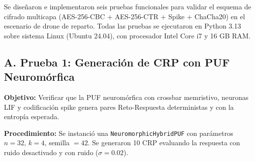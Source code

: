 Se diseñaron e implementaron seis pruebas funcionales para validar el esquema de cifrado multicapa (AES-256-CBC + AES-256-CTR + Spike + ChaCha20) en el escenario de drone de reparto. Todas las pruebas se ejecutaron en Python 3.13 sobre sistema Linux (Ubuntu 24.04), con procesador Intel Core i7 y 16 GB RAM.

\subsection*{A. Prueba 1: Generación de CRP con PUF Neuromórfica}

\textbf{Objetivo:} Verificar que la PUF neuromórfica con crossbar memristivo, neuronas LIF y codificación spike genera pares Reto-Respuesta deterministas y con la entropía esperada.

\textbf{Procedimiento:} Se instanció una \texttt{NeuromorphicHybridPUF} con parámetros $n=32$, $k=4$, semilla $=42$. Se generaron 10 CRP evaluando la respuesta con ruido desactivado y con ruido ($\sigma=0.02$).

\begin{table}[H]
    \centering\footnotesize\setlength{\tabcolsep}{3pt}
    \caption{CRP generados por la PUF Neuromórfica}
    \label{tab:crp-neuro}
\end{table}

